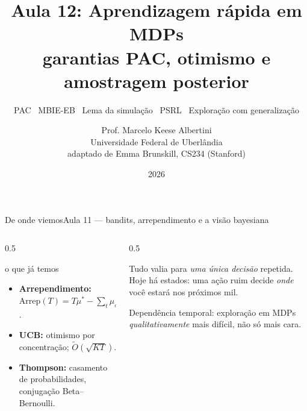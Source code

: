 \documentclass[aspectratio=169, 11pt]{beamer}
\title[Aula 12 — RL rápida em MDPs]{Aula 12: Aprendizagem rápida em MDPs\\ garantias PAC, otimismo e amostragem posterior}
\subtitle[Aprendizagem por Reforço]{PAC \textbullet\ MBIE-EB \textbullet\ Lema da simulação \textbullet\ PSRL \textbullet\ Exploração com generalização}
\author[Prof. Marcelo K. Albertini]{Prof. Marcelo Keese Albertini \\
  \footnotesize Universidade Federal de Uberlândia \\
  \footnotesize adaptado de Emma Brunskill, CS234 (Stanford)}
\institute{Universidade Federal de Uberlândia}
\date{2026}
\begin{document}
\begin{frame}\titlepage\end{frame}

\begin{frame}{De onde viemos}{Aula 11 --- bandits, arrependimento e a visão bayesiana}
  \begin{columns}[T]
    \begin{column}{0.5\textwidth}
      \begin{defbox}{o que já temos}
        \begin{itemize}
          \item \textbf{Arrependimento:} $\mathrm{Arrep}(T) = T\mu^{*} - \sum_{t}\mu_{a_t}$.
          \item \textbf{UCB:} otimismo por concentração; $\tilde{O}(\sqrt{KT})$.
          \item \textbf{Thompson:} casamento de probabilidades, conjugação Beta--Bernoulli.
        \end{itemize}
      \end{defbox}
    \end{column}
    \begin{column}{0.5\textwidth}
      \begin{ideiabox}
        Tudo valia para \emph{uma única decisão} repetida. Hoje há \alert{estados}:
        uma ação ruim decide \emph{onde} você estará nos próximos mil.
      \end{ideiabox}
      \begin{alertabox}
        Dependência temporal: exploração em MDPs \emph{qualitativamente}
        mais difícil, não só mais cara.
      \end{alertabox}
    \end{column}
  \end{columns}
\end{frame}
\end{document}
